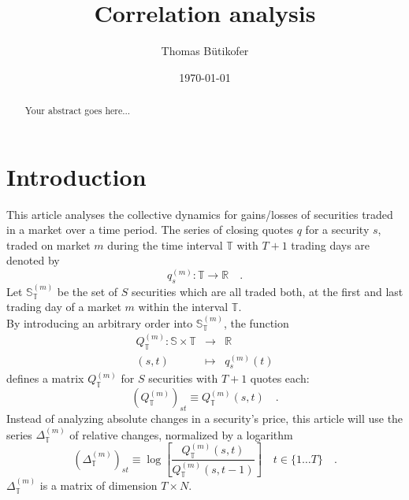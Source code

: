 \documentclass[11pt,twoside,a4paper]{article}
\numberwithin{equation}{section}
\begin{document}
\title{Correlation analysis}
\author{Thomas Bütikofer}
\date{\today}
\maketitle
\begin{abstract}
Your abstract goes here...
\end{abstract}
\section{Introduction}
This article analyses the collective dynamics for gains/losses of securities traded in a market over a time period.
The series of closing quotes $q$ for a security $s$, traded on market $m$ during the time interval $\mathbb{T}$ with $T+1$ trading days are denoted by
\begin{equation}
q^{(m)}_{s}:\mathbb{T}\rightarrow\mathbb{R}\quad.
\label{eqDefQuoteSeries}
\end{equation}
Let $\mathbb{S}^{(m)}_\mathbb{T}$ be the set of $S$ securities which are all traded both, at the first and last trading day of a market $m$ within the interval $\mathbb{T}$.\\
By introducing an arbitrary order into $\mathbb{S}^{(m)}_\mathbb{T}$, the function
\begin{eqnarray}
Q^{(m)}_{\mathbb{T}}:\mathbb{S}\times\mathbb{T}&\rightarrow&\mathbb{R}\\
(s,t)&\mapsto&q^{(m)}_s(t)
\end{eqnarray}
defines a matrix $Q^{(m)}_{\mathbb{T}}$ for $S$ securities with $T+1$ quotes each:
\begin{equation}
(Q^{(m)}_{\mathbb{T}})_{st}\equiv Q^{(m)}_{\mathbb{T}}(s,t)\quad.
\end{equation}
Instead of analyzing absolute changes in a security's price, this article will use the series $\Delta^{(m)}_{\mathbb{T}}$ of relative changes, normalized by a logarithm 
\begin{equation}
\left(\Delta^{(m)}_{\mathbb{T}}\right)_{st} \equiv \log\left[\frac{Q^{(m)}_{\mathbb{T}}(s,t)}{Q^{(m)}_{\mathbb{T}}(s,t-1)}\right]\quad t\in\{1\ldots T\}\quad.
\end{equation}
$\Delta^{(m)}_{\mathbb{T}}$ is a matrix of dimension $T\times N$.\\
\end{document}
